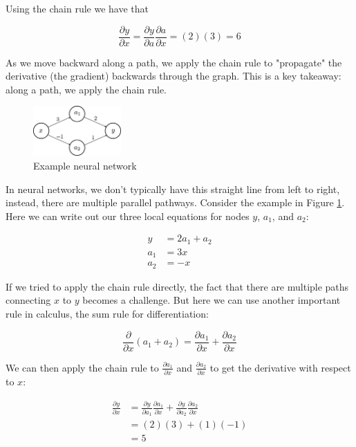 \documentclass{article}
\begin{document}
Using the chain rule we have that

\begin{equation}
    \dfrac{\partial y}{\partial x} = \dfrac{\partial y}{\partial a} \dfrac{\partial a}{\partial x} = (2)(3) = 6
\end{equation}

As we move backward along a path, we apply the chain rule to "propagate" the derivative (the gradient) backwards through the graph. This is a key takeaway: along a path, we apply the chain rule.

\begin{figure}[h]
\centering
\includegraphics[width=0.3\textwidth]{./neural_networks_gradients_ex2.eps}
\caption{Example neural network}
\label{fig:ex2}
\end{figure}

In neural networks, we don't typically have this straight line from left to right, instead, there are multiple parallel pathways. Consider the example in Figure \ref{fig:ex2}. Here we can write out our three local equations for nodes $y$, $a_1$, and $a_2$:

\begin{align}
    y &= 2a_1 + a_2 \\
    a_1 &= 3x \\
    a_2 &= -x
\end{align}

If we tried to apply the chain rule directly, the fact that there are multiple paths connecting $x$ to $y$ becomes a challenge. But here we can use another important rule in calculus, the sum rule for differentiation:

\begin{equation}
    \dfrac{\partial}{\partial x} (a_1 + a_2) = \dfrac{\partial a_1}{\partial x} + \dfrac{\partial a_2}{\partial x}
\end{equation}

We can then apply the chain rule to $\frac{\partial a_1}{\partial x}$ and $\frac{\partial a_2}{\partial x}$ to get the derivative with respect to $x$:

\begin{equation}
\begin{split}
    \frac{\partial y}{\partial x} &= \frac{\partial y}{\partial a_1} \frac{\partial a_1}{\partial x} + \frac{\partial y}{\partial a_2} \frac{\partial a_2}{\partial x} \\
    &= (2)(3) + (1)(-1) \\
    &= 5
\end{split}
\end{equation}
\end{document}
